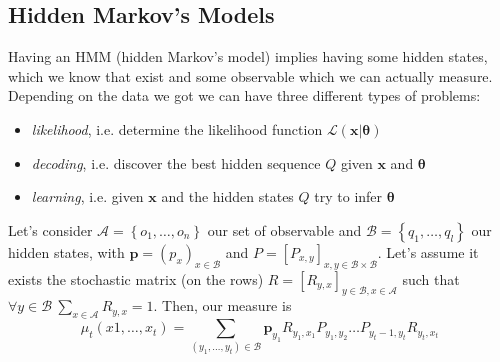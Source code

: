 \subsection{Hidden Markov's Models}
Having an HMM (hidden Markov's model) implies having some hidden states, which we know that exist and some observable which we can actually measure.
Depending on the data we got we can have three different types of problems:
\begin{itemize}
    \item \emph{likelihood}, i.e. determine the likelihood function $\mathcal{L}\left(\mathbf{x} \vert \mathbf{\theta}\right)$
    \item \emph{decoding}, i.e. discover the best hidden sequence $Q$ given $\mathbf{x}$ and $\mathbf{\theta}$
    \item \emph{learning}, i.e. given $\mathbf{x}$ and the hidden states $Q$ try to infer $\mathbf{\theta}$
\end{itemize}
Let's consider $\mathcal{A} = \left\{o_1, \ldots, o_n\right\}$ our set of observable and $\mathcal{B} = \left\{q_1, \ldots, q_l\right\}$ our hidden states, with $\mathbf{p} = \left(p_x\right)_{x \in \mathcal{B}}$ and $P = \left[P_{x,y}\right]_{x,y \in \mathcal{B} \times \mathcal{B}}$.
Let's assume it exists the stochastic matrix (on the rows) $R = \left[R_{y,x}\right]_{y \in \mathcal{B}, x \in \mathcal{A}}$ such that $\forall y \in \mathcal{B} \ \sum_{x \in \mathcal{A}} R_{y,x} = 1$.
Then, our measure is
\begin{equation*}
    \mu_t\left(x1, \ldots, x_t\right) = \sum_{\left(y_1, \ldots, y_t\right) \in \mathcal{B}} \mathbf{p}_{y_1}R_{y_1, x_1}P_{y_1,y_2} \ldots P_{y_t-1,y_t}R_{y_t, x_t}
\end{equation*}